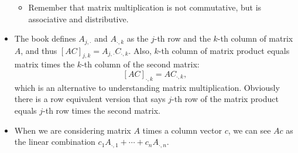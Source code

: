 \documentclass{article}
\begin{document}
\begin{itemize}
\begin{itemize}
        \item Remember that matrix multiplication is not commutative, but is associative and distributive.
    \end{itemize}
    \item The book defines $A_{j,\cdot}$ and $A_{\cdot,k}$ as the $j$-th row and the $k$-th column of matrix $A$, and thus $[AC]_{j,k} = A_{j,\cdot}C_{\cdot,k}$. Also, $k$-th column of matrix product equals matrix times the $k$-th column of the second matrix: $$[AC]_{\cdot,k} = AC_{\cdot,k},$$ which is an alternative to understanding matrix multiplication. Obviously there is a row equivalent version that says $j$-th row of the matrix product equals $j$-th row times the second matrix.
    \item When we are considering matrix $A$ times a column vector $c$, we can see $Ac$ as the linear combination $c_1A_{\cdot,1} + \cdots + c_nA_{\cdot,n}$.
\end{itemize}
\end{document}
